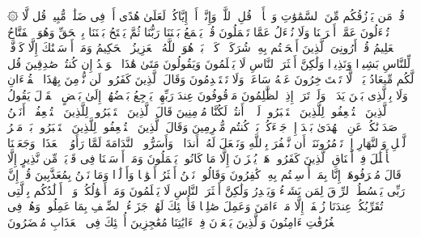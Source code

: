 \stopbuffer%
\startbuffer[\q:34:24]
۞ قُلۡ مَن یَرۡزُقُكُم مِّنَ ٱلسَّمَٰوَٰتِ وَٱلۡأَرۡضِۖ قُلِ ٱللَّهُۖ وَإِنَّاۤ أَوۡ إِیَّاكُمۡ لَعَلَىٰ هُدًى أَوۡ فِی ضَلَٰلࣲ مُّبِینࣲ%
\stopbuffer%
\startbuffer[\q:34:25]
قُل لَّا تُسۡءَلُونَ عَمَّاۤ أَجۡرَمۡنَا وَلَا نُسۡءَلُ عَمَّا تَعۡمَلُونَ%
\stopbuffer%
\startbuffer[\q:34:26]
قُلۡ یَجۡمَعُ بَیۡنَنَا رَبُّنَا ثُمَّ یَفۡتَحُ بَیۡنَنَا بِٱلۡحَقِّ وَهُوَ ٱلۡفَتَّاحُ ٱلۡعَلِیمُ%
\stopbuffer%
\startbuffer[\q:34:27]
قُلۡ أَرُونِیَ ٱلَّذِینَ أَلۡحَقۡتُم بِهِۦ شُرَكَاۤءَۖ كَلَّاۚ بَلۡ هُوَ ٱللَّهُ ٱلۡعَزِیزُ ٱلۡحَكِیمُ%
\stopbuffer%
\startbuffer[\q:34:28]
وَمَاۤ أَرۡسَلۡنَٰكَ إِلَّا كَاۤفَّةࣰ لِّلنَّاسِ بَشِیرࣰا وَنَذِیرࣰا وَلَٰكِنَّ أَكۡثَرَ ٱلنَّاسِ لَا یَعۡلَمُونَ%
\stopbuffer%
\startbuffer[\q:34:29]
وَیَقُولُونَ مَتَىٰ هَٰذَا ٱلۡوَعۡدُ إِن كُنتُمۡ صَٰدِقِینَ%
\stopbuffer%
\startbuffer[\q:34:30]
قُل لَّكُم مِّیعَادُ یَوۡمࣲ لَّا تَسۡتَءۡخِرُونَ عَنۡهُ سَاعَةࣰ وَلَا تَسۡتَقۡدِمُونَ%
\stopbuffer%
\startbuffer[\q:34:31]
وَقَالَ ٱلَّذِینَ كَفَرُوا۟ لَن نُّؤۡمِنَ بِهَٰذَا ٱلۡقُرۡءَانِ وَلَا بِٱلَّذِی بَیۡنَ یَدَیۡهِۗ وَلَوۡ تَرَىٰۤ إِذِ ٱلظَّٰلِمُونَ مَوۡقُوفُونَ عِندَ رَبِّهِمۡ یَرۡجِعُ بَعۡضُهُمۡ إِلَىٰ بَعۡضٍ ٱلۡقَوۡلَ یَقُولُ ٱلَّذِینَ ٱسۡتُضۡعِفُوا۟ لِلَّذِینَ ٱسۡتَكۡبَرُوا۟ لَوۡلَاۤ أَنتُمۡ لَكُنَّا مُؤۡمِنِینَ%
\stopbuffer%
\startbuffer[\q:34:32]
قَالَ ٱلَّذِینَ ٱسۡتَكۡبَرُوا۟ لِلَّذِینَ ٱسۡتُضۡعِفُوۤا۟ أَنَحۡنُ صَدَدۡنَٰكُمۡ عَنِ ٱلۡهُدَىٰ بَعۡدَ إِذۡ جَاۤءَكُمۖ بَلۡ كُنتُم مُّجۡرِمِینَ%
\stopbuffer%
\startbuffer[\q:34:33]
وَقَالَ ٱلَّذِینَ ٱسۡتُضۡعِفُوا۟ لِلَّذِینَ ٱسۡتَكۡبَرُوا۟ بَلۡ مَكۡرُ ٱلَّیۡلِ وَٱلنَّهَارِ إِذۡ تَأۡمُرُونَنَاۤ أَن نَّكۡفُرَ بِٱللَّهِ وَنَجۡعَلَ لَهُۥۤ أَندَادࣰاۚ وَأَسَرُّوا۟ ٱلنَّدَامَةَ لَمَّا رَأَوُا۟ ٱلۡعَذَابَۚ وَجَعَلۡنَا ٱلۡأَغۡلَٰلَ فِیۤ أَعۡنَاقِ ٱلَّذِینَ كَفَرُوا۟ۖ هَلۡ یُجۡزَوۡنَ إِلَّا مَا كَانُوا۟ یَعۡمَلُونَ%
\stopbuffer%
\startbuffer[\q:34:34]
وَمَاۤ أَرۡسَلۡنَا فِی قَرۡیَةࣲ مِّن نَّذِیرٍ إِلَّا قَالَ مُتۡرَفُوهَاۤ إِنَّا بِمَاۤ أُرۡسِلۡتُم بِهِۦ كَٰفِرُونَ%
\stopbuffer%
\startbuffer[\q:34:35]
وَقَالُوا۟ نَحۡنُ أَكۡثَرُ أَمۡوَٰلࣰا وَأَوۡلَٰدࣰا وَمَا نَحۡنُ بِمُعَذَّبِینَ%
\stopbuffer%
\startbuffer[\q:34:36]
قُلۡ إِنَّ رَبِّی یَبۡسُطُ ٱلرِّزۡقَ لِمَن یَشَاۤءُ وَیَقۡدِرُ وَلَٰكِنَّ أَكۡثَرَ ٱلنَّاسِ لَا یَعۡلَمُونَ%
\stopbuffer%
\startbuffer[\q:34:37]
وَمَاۤ أَمۡوَٰلُكُمۡ وَلَاۤ أَوۡلَٰدُكُم بِٱلَّتِی تُقَرِّبُكُمۡ عِندَنَا زُلۡفَىٰۤ إِلَّا مَنۡ ءَامَنَ وَعَمِلَ صَٰلِحࣰا فَأُو۟لَٰۤئِكَ لَهُمۡ جَزَاۤءُ ٱلضِّعۡفِ بِمَا عَمِلُوا۟ وَهُمۡ فِی ٱلۡغُرُفَٰتِ ءَامِنُونَ%
\stopbuffer%
\startbuffer[\q:34:38]
وَٱلَّذِینَ یَسۡعَوۡنَ فِیۤ ءَایَٰتِنَا مُعَٰجِزِینَ أُو۟لَٰۤئِكَ فِی ٱلۡعَذَابِ مُحۡضَرُونَ%
